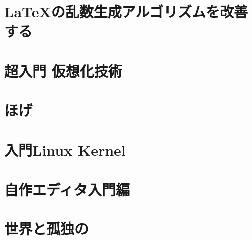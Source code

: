 \documentclass[autodetect-engine,dvipdfmx-if-dvi,ja=standard,a5paper,12pt,twoside,openany,layout=v2,tombow]{bxjsbook}
\newcommand{\articlepath}{./articles}
\begin{document}
\chapter{\LaTeX の乱数生成アルゴリズムを改善する}


\chapter{超入門 仮想化技術}


\chapter{ほげ}


\chapter{入門Linux Kernel}


\chapter{自作エディタ入門編}


\chapter{世界と孤独の}


\newpage
\myimpression
\end{document}
